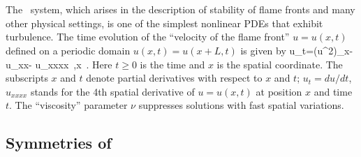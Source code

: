 

\section{\KSe}
\label{s-KS}


The \KS\ system, which
arises in the description of stability of
flame fronts and many other physical settings,
is one of the simplest nonlinear PDEs that
exhibit turbulence.
The time evolution of the ``velocity of the flame front'' 
$u=u(x,t)$ defined on a periodic domain
$u(x,t) = u(x+L,t)$
is given by
\beq
u_t=(u^2)_x-u_{xx}- \nu u_{xxxx}
\,,\qquad	x \in [0,L]
\,.
Here $t \geq 0$ is the time and
$x$ is the spatial coordinate.
The subscripts $x$ and $t$ denote partial derivatives with respect to
$x$ and $t$;
$u_t = du/dt$, $u_{xxxx}$ stands for the 4th spatial
derivative of 
$u=u(x,t)$ at position $x$ and time $t$.
The ``viscosity'' parameter 
$\nu$ 
suppresses solutions with fast spatial variations.





\subsection{Symmetries of \KSe}






